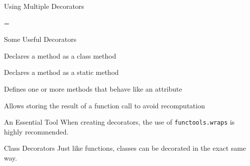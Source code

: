 \begin{frame}{Using Multiple Decorators}
  \begin{center}
    {\Huge =}
  \end{center}
\end{frame}

\begin{frame}{Some Useful Decorators}
  \begin{description}[<+->]
    \item[\texttt{classmethod}] Declares a method as a class method
    \item[\texttt{staticmethod}] Declares a method as a static method
    \item[\texttt{property}] Defines one or more methods that behave like an attribute
    \item[\texttt{functools.cache}] Allows storing the result of a function call to avoid recomputation
  \end{description}
\end{frame}

\begin{frame}{An Essential Tool}
  When creating decorators, the use of \texttt{functools.wraps} is \alert{highly} recommended.
\end{frame}

\begin{frame}{Class Decorators}
  Just like functions, classes can be decorated in the exact same way.
\end{frame}